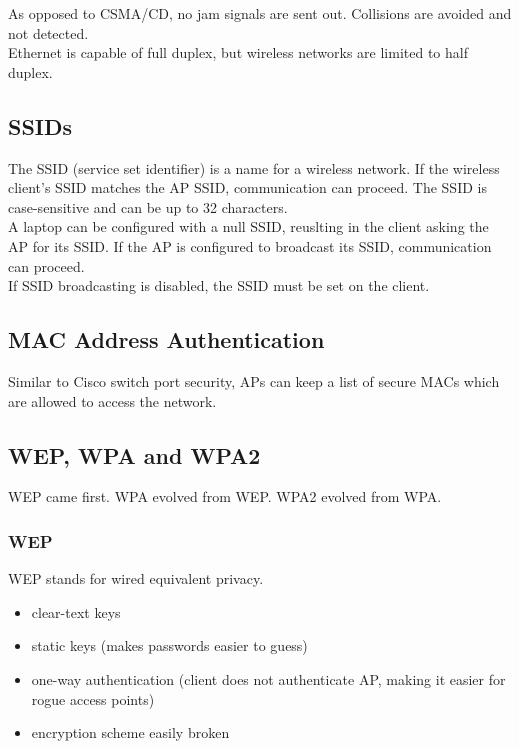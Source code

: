 As opposed to CSMA/CD, no jam signals are sent out. Collisions are avoided
and not detected.\\

Ethernet is capable of full duplex, but wireless networks are limited to half
duplex.

\subsection{SSIDs}

The SSID (service set identifier) is a name for a wireless network. If the
wireless client's SSID matches the AP SSID, communication can proceed. The SSID
is case-sensitive and can be up to 32 characters.\\

A laptop can be configured with a null SSID, reuslting in the client asking
the AP for its SSID. If the AP is configured to broadcast its SSID,
communication can proceed.\\

If SSID broadcasting is disabled, the SSID must be set on the client.

\subsection{MAC Address Authentication}

Similar to Cisco switch port security, APs can keep a list of secure MACs
which are allowed to access the network.

\subsection{WEP, WPA and WPA2}

WEP came first. WPA evolved from WEP. WPA2 evolved from WPA.

\subsubsection{WEP}

WEP stands for wired equivalent privacy.

\begin{itemize}

\item clear-text keys
\item static keys (makes passwords easier to guess)
\item one-way authentication (client does not authenticate AP, making it easier
for rogue access points)
\item encryption scheme easily broken

\end{itemize}

